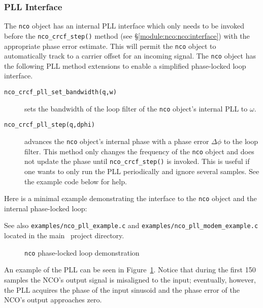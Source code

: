 \subsubsection{PLL Interface}
\label{module:nco:pll:interface}
The {\tt nco} object has an internal PLL interface which only needs to
be invoked before the {\tt nco\_crcf\_step()} method
(see \S\ref{module:nco:nco:interface}) with the appropriate phase
error estimate.
This will permit the {\tt nco} object to automatically track to a
carrier offset for an incoming signal.
%
The {\tt nco} object has the following PLL method extensions to enable a
simplified phase-locked loop interface.
%
\begin{description}
\item[{\tt nco\_crcf\_pll\_set\_bandwidth(q,w)}]
    sets the bandwidth of the loop filter of the {\tt nco} object's
    internal PLL to $\omega$.
\item[{\tt nco\_crcf\_pll\_step(q,dphi)}]
    advances the {\tt nco} object's internal phase with a phase error
    $\Delta\phi$ to the loop filter.
    This method only changes the frequency of the {\tt nco} object and does
    not update the phase until {\tt nco\_crcf\_step()} is invoked.
    This is useful if one wants to only run the PLL periodically and ignore
    several samples.
    See the example code below for help.
\end{description}
%
Here is a minimal example demonstrating the interface to the {\tt nco}
object and the internal phase-locked loop:
%

%
See also
{\tt examples/nco\_pll\_example.c} and
{\tt examples/nco\_pll\_modem\_example.c}
located in the main \liquid\ project directory.
%
\begin{figure}
\centering
{}
\caption{{\tt nco} phase-locked loop demonstration}
\label{fig:module:nco:pll}
\end{figure}
%
An example of the PLL can be seen in Figure~\ref{fig:module:nco:pll}.
Notice that during the first 150 samples the NCO's output signal is
misaligned to the input;
eventually, however, the PLL acquires the phase of the input sinusoid
and the phase error of the NCO's output approaches zero.

